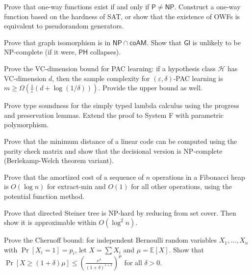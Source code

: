 \documentclass[12pt,a4paper]{exam}
\begin{document}
\begin{questions}
\question[9]
Prove that one-way functions exist if and only if $\mathsf{P} \neq \mathsf{NP}$. Construct a one-way function based on the hardness of SAT, or show that the existence of OWFs is equivalent to pseudorandom generators.

\vspace{0.3cm}

\question[2]
Prove that graph isomorphism is in $\mathsf{NP} \cap \mathsf{coAM}$. Show that $\mathsf{GI}$ is unlikely to be NP-complete (if it were, $\mathsf{PH}$ collapses).

\vspace{0.3cm}

\question[6]
Prove the VC-dimension bound for PAC learning: if a hypothesis class $\mathcal{H}$ has VC-dimension $d$, then the sample complexity for $(\varepsilon,\delta)$-PAC learning is $m \geq \Omega(\frac{1}{\varepsilon}(d + \log(1/\delta)))$. Provide the upper bound as well.

\vspace{0.3cm}

\question[4]
Prove type soundness for the simply typed lambda calculus using the progress and preservation lemmas. Extend the proof to System F with parametric polymorphism.

\vspace{0.3cm}

\question[3]
Prove that the minimum distance of a linear code can be computed using the parity check matrix and show that the decisional version is NP-complete (Berlekamp-Welch theorem variant).

\vspace{0.3cm}

\question[5]
Prove that the amortized cost of a sequence of $n$ operations in a Fibonacci heap is $O(\log n)$ for extract-min and $O(1)$ for all other operations, using the potential function method.

\vspace{0.3cm}

\question[3]
Prove that directed Steiner tree is NP-hard by reducing from set cover. Then show it is approximable within $O(\log^2 n)$.

\vspace{0.3cm}

\question[3]
Prove the Chernoff bound: for independent Bernoulli random variables $X_1,\ldots,X_n$ with $\Pr[X_i = 1] = p_i$, let $X = \sum X_i$ and $\mu = \mathbb{E}[X]$. Show that $\Pr[X \geq (1+\delta)\mu] \leq (\frac{e^\delta}{(1+\delta)^{1+\delta}})^\mu$ for all $\delta > 0$.


\end{questions}
\end{document}
